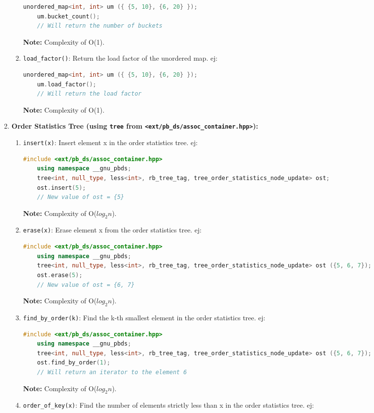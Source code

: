 \begin{enumerate}
\begin{enumerate}
	\begin{lstlisting}[language=C++]
	unordered_map<int, int> um ({ {5, 10}, {6, 20} });
	um.bucket_count();
	// Will return the number of buckets
	\end{lstlisting}
	\textbf{Note:} Complexity of O(1).
      \item \texttt{load\_factor()}: Return the load factor of the unordered map. ej:
	\begin{lstlisting}[language=C++]
	unordered_map<int, int> um ({ {5, 10}, {6, 20} });
	um.load_factor();
	// Will return the load factor
	\end{lstlisting}
	\textbf{Note:} Complexity of O(1).
    \end{enumerate}
  \item \textbf{Order Statistics Tree (using \texttt{tree} from \texttt{<ext/pb\_ds/assoc\_container.hpp>}):}
    \begin{enumerate}
      \item \texttt{insert(x)}: Insert element x in the order statistics tree. ej:
	\begin{lstlisting}[language=C++]
	#include <ext/pb_ds/assoc_container.hpp>
	using namespace __gnu_pbds;
	tree<int, null_type, less<int>, rb_tree_tag, tree_order_statistics_node_update> ost;
	ost.insert(5);
	// New value of ost = {5}
	\end{lstlisting}
	\textbf{Note:} Complexity of O($log_2n$).
      \item \texttt{erase(x)}: Erase element x from the order statistics tree. ej:
	\begin{lstlisting}[language=C++]
	#include <ext/pb_ds/assoc_container.hpp>
	using namespace __gnu_pbds;
	tree<int, null_type, less<int>, rb_tree_tag, tree_order_statistics_node_update> ost ({5, 6, 7});
	ost.erase(5);
	// New value of ost = {6, 7}
	\end{lstlisting}
	\textbf{Note:} Complexity of O($log_2n$).
      \item \texttt{find\_by\_order(k)}: Find the k-th smallest element in the order statistics tree. ej:
	\begin{lstlisting}[language=C++]
	#include <ext/pb_ds/assoc_container.hpp>
	using namespace __gnu_pbds;
	tree<int, null_type, less<int>, rb_tree_tag, tree_order_statistics_node_update> ost ({5, 6, 7});
	ost.find_by_order(1);
	// Will return an iterator to the element 6
	\end{lstlisting}
	\textbf{Note:} Complexity of O($log_2n$).
      \item \texttt{order\_of\_key(x)}: Find the number of elements strictly less than x in the order statistics tree. ej:

\end{enumerate}
\end{enumerate}
